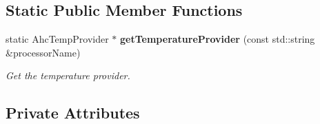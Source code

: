 \subsection*{Static Public Member Functions}
\begin{DoxyCompactItemize}
\item 
static Ahc\-Temp\-Provider $\ast$ {\bf get\-Temperature\-Provider} (const std\-::string \&processor\-Name)
\begin{DoxyCompactList}\small\item\em Get the temperature provider. \end{DoxyCompactList}\end{DoxyCompactItemize}
\subsection*{Private Attributes}
